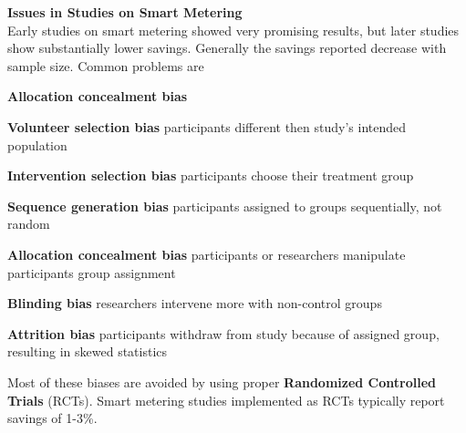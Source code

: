 \begin{tcolorbox}
\textbf{Issues in Studies on Smart Metering}\\
Early studies on smart metering showed very promising results, but later studies show substantially lower savings.
Generally the savings reported decrease with sample size.
Common problems are

\begin{labeling}{\textbf{Allocation concealment bias}}
    \item [\textbf{Volunteer selection bias}]
    participants different then study's intended population
    \item [\textbf{Intervention selection bias}]
    participants choose their treatment group
    \item [\textbf{Sequence generation bias}]
    participants assigned to groups sequentially, not random
    \item [\textbf{Allocation concealment bias}]
    participants or researchers manipulate participants group assignment
    \item [\textbf{Blinding bias}]
    researchers intervene more with non-control groups
    \item [\textbf{Attrition bias}]
    participants withdraw from study because of assigned group, resulting in skewed statistics
\end{labeling}

 Most of these biases are avoided by using proper \textbf{Randomized Controlled Trials} (RCTs). Smart metering studies implemented as RCTs typically report savings of 1-3\%.

\end{tcolorbox}

